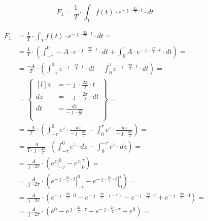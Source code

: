 \begin{task}
\begin{equation}
	F_1=\frac{1}{T} \cdot \int_{T}f(t) \cdot e^{-\jmath \cdot \frac{2\pi}{T} \cdot t} \cdot dt
\end{equation}


\begin{align*}
F_1&=\frac{1}{T} \cdot \int_{T}f(t) \cdot e^{-\jmath \cdot \frac{2\pi}{T} \cdot t} \cdot dt=\\
&=\frac{1}{T} \cdot \left(\int_{-\tau}^{0}-A \cdot e^{-\jmath \cdot \frac{2\pi}{T} \cdot t} \cdot dt + \int_{0}^{\tau}A \cdot e^{-\jmath \cdot \frac{2\pi}{T} \cdot t} \cdot dt\right)=\\
&=\frac{-A}{T} \cdot \left(\int_{-\tau}^{0}e^{-\jmath \cdot \frac{2\pi}{T} \cdot t} \cdot dt - \int_{0}^{\tau}e^{-\jmath \cdot \frac{2\pi}{T} \cdot t} \cdot dt\right)=\\
&=\begin{Bmatrix*}[l]
z&=-\jmath \cdot \frac{2\pi}{T} \cdot t\\
dz&=-\jmath \cdot \frac{2\pi}{T} \cdot dt\\
dt&=\frac{dz}{-\jmath \cdot \frac{2\pi}{T}}\\
\end{Bmatrix*}=\\
&=\frac{-A}{T} \cdot \left(\int_{-\tau}^{0} e^{z} \cdot \frac{dz}{-\jmath \cdot \frac{2\pi}{T}}-\int_{0}^{\tau} e^{z} \cdot \frac{dz}{-\jmath \cdot \frac{2\pi}{T}}\right)=\\
&=\frac{A}{T \cdot \jmath \cdot \frac{2\pi}{T}} \cdot \left(\int_{-\tau}^{0} e^{z} \cdot dz - \int_{0}^{-\tau} e^{z} \cdot dz\right)=\\
&=\frac{A}{\jmath \cdot 2 \pi} \cdot \left(\left. e^{z} \right|_{-\tau}^{0} - \left. e^{z} \right|_{0}^{\tau}\right)=\\
&=\frac{A}{\jmath \cdot 2 \pi} \cdot \left(\left. e^{-\jmath \cdot \frac{2\pi}{T} \cdot t} \right|_{-\tau}^{0} - \left. e^{-\jmath \cdot \frac{2\pi}{T} \cdot t} \right|_{0}^{\tau}\right)=\\
&=\frac{A}{\jmath \cdot 2 \pi} \cdot \left( e^{-\jmath \cdot \frac{2\pi}{T} \cdot 0} - e^{-\jmath \cdot \frac{2\pi}{T} \cdot (-\tau)} -e^{-\jmath \cdot \frac{2\pi}{T} \cdot \tau} + e^{-\jmath \cdot \frac{2\pi}{T} \cdot 0}\right)=\\
&=\frac{A}{\jmath \cdot 2 \pi} \cdot \left( e^{0} - e^{\jmath \cdot \frac{2\pi}{T} \cdot \tau} -e^{-\jmath \cdot \frac{2\pi}{T} \cdot \tau}+e^{0}\right)=\\

\end{align*}
\end{task}
